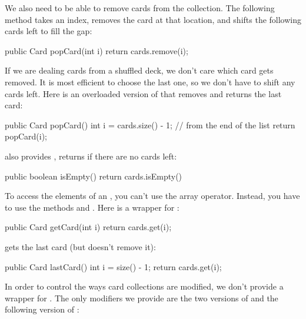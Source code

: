We also need to be able to remove cards from the collection.
The following method takes an index, removes the card at that location, and shifts the following cards left to fill the gap:

\begin{code}
public Card popCard(int i) {
    return cards.remove(i);
}
\end{code}


If we are dealing cards from a shuffled deck, we don't care which card gets removed.
It is most efficient to choose the last one, so we don't have to shift any cards left.
Here is an overloaded version of  that removes and returns the last card:

\begin{code}
public Card popCard() {
    int i = cards.size() - 1;    // from the end of the list
    return popCard(i);
}
\end{code}


 also provides , returns  if there are no cards left:

\begin{code}
public boolean isEmpty() {
    return cards.isEmpty()
}
\end{code}

To access the elements of an , you can't use the array \java{[]} operator.
Instead, you have to use the methods  and .
Here is a wrapper for :

\begin{code}
public Card getCard(int i) {
    return cards.get(i);
}
\end{code}

 gets the last card (but doesn't remove it):

\begin{code}
public Card lastCard() {
    int i = size() - 1;
    return cards.get(i);
}
\end{code}


In order to control the ways card collections are modified, we don't provide a wrapper for .
The only modifiers we provide are the two versions of  and the following version of :

